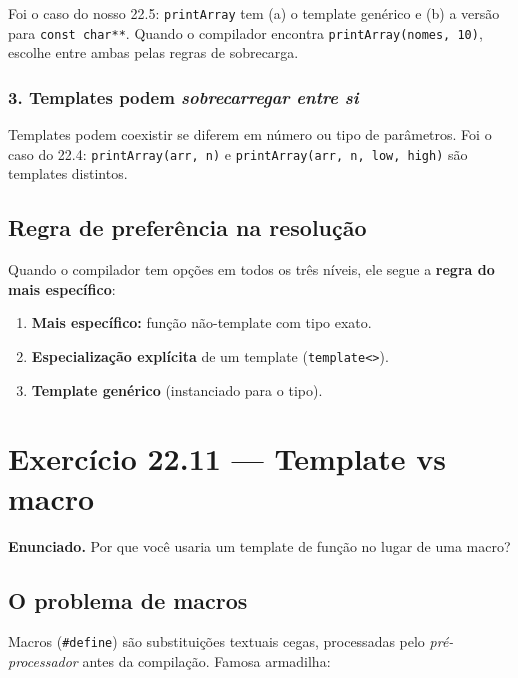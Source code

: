 \documentclass[11pt,a4paper]{article}
\begin{document}
Foi o caso do nosso 22.5: \texttt{printArray} tem (a) o template gen\'erico e (b) a vers\~ao para \texttt{const char**}. Quando o compilador encontra \texttt{printArray(nomes, 10)}, escolhe entre ambas pelas regras de sobrecarga.

\subsubsection*{3. Templates podem \emph{sobrecarregar entre si}}

Templates podem coexistir se diferem em n\'umero ou tipo de par\^ametros. Foi o caso do 22.4: \texttt{printArray(arr, n)} e \texttt{printArray(arr, n, low, high)} s\~ao templates distintos.

\subsection*{Regra de prefer\^encia na resolu\c{c}\~ao}

Quando o compilador tem op\c{c}\~oes em todos os tr\^es n\'iveis, ele segue a \textbf{regra do mais espec\'ifico}:

\begin{enumerate}[leftmargin=*,itemsep=0pt]
  \item \textbf{Mais espec\'ifico:} fun\c{c}\~ao n\~ao-template com tipo exato.
  \item \textbf{Especializa\c{c}\~ao expl\'icita} de um template (\texttt{template<>}).
  \item \textbf{Template gen\'erico} (instanciado para o tipo).
\end{enumerate}

\section{Exerc\'icio 22.11 --- Template vs macro}

\begin{enunciado}
\textbf{Enunciado.} Por que voc\^e usaria um template de fun\c{c}\~ao no lugar de uma macro?
\end{enunciado}

\subsection*{O problema de macros}

Macros (\texttt{\#define}) s\~ao substitui\c{c}\~oes textuais cegas, processadas pelo \emph{pr\'e-processador} antes da compila\c{c}\~ao. Famosa armadilha:
\end{document}
